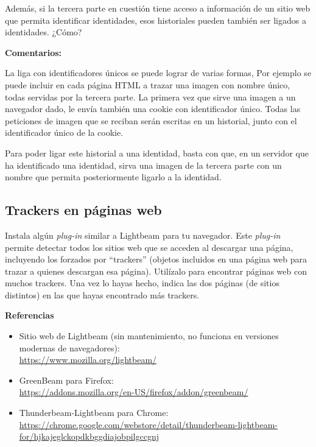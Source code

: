 Además, si la tercera parte en cuestión tiene acceso a información de un sitio web que permita identificar identidades, esos historiales pueden también ser ligados a identidades. ¿Cómo?

\textbf{Comentarios:}

La liga con identificadores únicos se puede lograr de varias formas, Por ejemplo se puede incluir en cada página HTML a trazar una imagen con nombre único, todas servidas por la tercera parte. La primera vez que sirve una imagen a un navegador dado, le envía también una cookie con identificador único. Todas las peticiones de imagen que se reciban serán escritas en un historial, junto con el identificador único de la cookie.

Para poder ligar este historial a una identidad, basta con que, en un servidor que ha identificado una identidad, sirva una imagen de la tercera parte con un nombre que permita posteriormente ligarlo a la identidad.

\subsection{Trackers en páginas web}
\label{subsec:trackers-paginas-web}

Instala algún \emph{plug-in} similar a Lightbeam para tu navegador. Este \emph{plug-in} permite detectar todos los sitios web que se acceden al descargar una página, incluyendo los forzados por ``trackers'' (objetos incluidos en una página web para trazar a quienes descargan esa página). Utilízalo para encontrar páginas web con muchos trackers. Una vez lo hayas hecho, indica las dos páginas (de sitios distintos) en las que hayas encontrado más trackers.

\textbf{Referencias}

\begin{itemize}
\item Sitio web de Lightbeam (sin mantenimiento, no funciona en versiones modernas de navegadores): \\
  \url{https://www.mozilla.org/lightbeam/}
\item GreenBeam para Firefox: \\
  \url{https://addons.mozilla.org/en-US/firefox/addon/greenbeam/}
\item Thunderbeam-Lightbeam para Chrome: \\
  \url{https://chrome.google.com/webstore/detail/thunderbeam-lightbeam-for/hjkajeglckopdkbggdiajobpilgccgnj}
\end{itemize}

